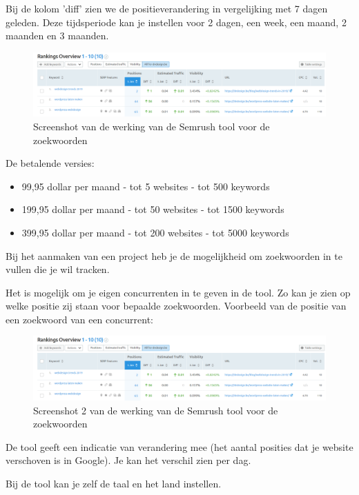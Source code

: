 Bij de kolom 'diff' zien we de positieverandering in vergelijking met 7 dagen geleden. Deze tijdsperiode kan je instellen voor 2 dagen, een week, een maand, 2 maanden en 3 maanden. 

\begin{figure}[h!]
\centering
\includegraphics[width=\linewidth]{img/semrushranking.PNG}
\caption{Screenshot van de werking van de Semrush tool voor de zoekwoorden
\autocite{semrush}}
\end{figure}

De betalende versies: 
\begin{itemize}
\item 99,95 dollar per maand - tot 5 websites - tot 500 keywords
\item 199,95 dollar per maand - tot 50 websites - tot 1500 keywords
\item 399,95 dollar per maand - tot 200 websites - tot 5000 keywords
\end{itemize}

Bij het aanmaken van een project heb je de mogelijkheid om zoekwoorden in te vullen die je wil tracken. 

Het is mogelijk om je eigen concurrenten in te geven in de tool. Zo kan je zien op welke positie zij staan voor bepaalde zoekwoorden. Voorbeeld van de positie van een zoekwoord van een concurrent: 

\begin{figure}[h!]
\centering
\includegraphics[width=\linewidth]{img/semrushranking.PNG}
\caption{Screenshot 2 van de werking van de Semrush tool voor de zoekwoorden
\autocite{semrush}}
\end{figure}

De tool geeft een indicatie van verandering mee (het aantal posities dat je website verschoven is in Google). Je kan het verschil zien per dag. 

Bij de tool kan je zelf de taal en het land instellen. 

